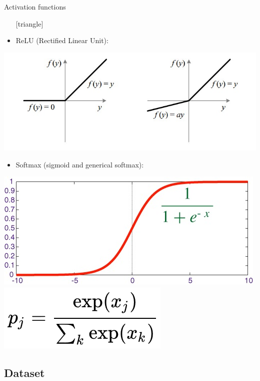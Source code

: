 \documentclass{beamer}
\begin{document}
\begin{frame}{Activation functions}
	\begin{itemize}
		\setlength\itemsep{1em}
		[triangle]
		\item 
			ReLU (Rectified Linear Unit):
	\end{itemize}
	\begin{center}
		\includegraphics[scale=0.30]{ReLU}
	\end{center}
	\begin{itemize}
		\setlength\itemsep{1em}
		[triangle]
		\item 
			Softmax (sigmoid and generical softmax):
	\end{itemize}
	\begin{center}
		\includegraphics[scale=0.25]{softmax1}
		\includegraphics[scale=0.6]{softm}
	\end{center}
\end{frame}

\subsection{Dataset}
\end{document}
